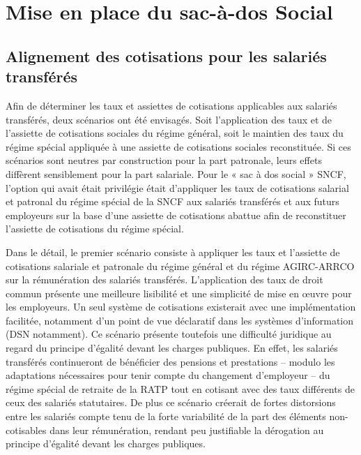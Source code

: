 \clearpage 

\section{Mise en place du sac-à-dos Social}

\subsection{Alignement des cotisations pour les salariés transférés}

Afin de déterminer les taux et assiettes de cotisations applicables aux salariés transférés, deux scénarios ont été envisagés.
Soit l’application des taux et de l’assiette de cotisations sociales du régime général, soit le maintien des taux du régime spécial appliquée à une assiette de cotisations sociales reconstituée. Si ces scénarios sont neutres par construction pour la part patronale, leurs effets diffèrent sensiblement pour la part salariale. Pour le « sac à dos social » SNCF, l'option qui avait était privilégie était d’appliquer les taux de cotisations salarial et patronal du régime spécial de la SNCF aux salariés transférés et aux futurs employeurs sur la base d’une assiette de cotisations abattue afin de reconstituer l’assiette de cotisations du régime spécial.  

Dans le détail, le premier scénario consiste à appliquer les taux et l’assiette de cotisations salariale et patronale du régime général et du régime AGIRC-ARRCO sur la rémunération des salariés transférés. L’application des taux de droit commun présente une meilleure lisibilité et une simplicité de mise en œuvre pour les employeurs. Un seul système de cotisations existerait avec une implémentation facilitée, notamment d’un point de vue déclaratif dans les systèmes d’information (DSN notamment).
Ce scénario présente toutefois une difficulté juridique au regard du principe d’égalité devant les charges publiques. En effet, les salariés transférés continueront de bénéficier des pensions et prestations – modulo les adaptations nécessaires pour tenir compte du changement d’employeur – du régime spécial de retraite de la RATP tout en cotisant avec des taux différents de ceux des salariés statutaires. De plus ce scénario créerait de fortes distorsions entre les salariés compte tenu de la forte variabilité de
la part des éléments non-cotisables dans leur rémunération, rendant peu justifiable la dérogation au principe d’égalité devant les charges publiques. 

